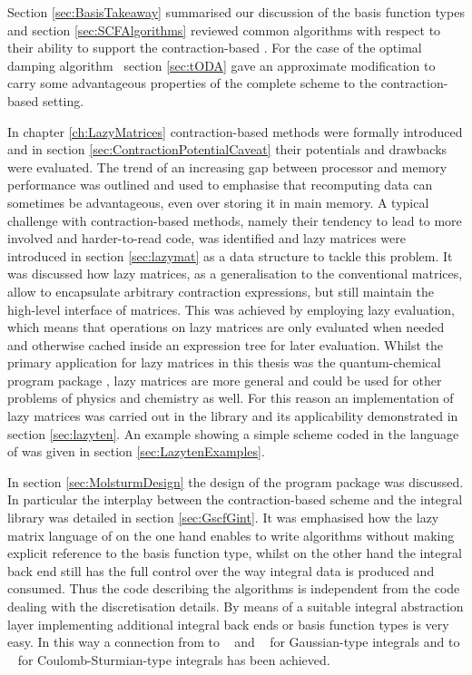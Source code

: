 Section \ref{sec:BasisTakeaway} summarised our discussion of the basis
function types and section \ref{sec:SCFAlgorithms}
reviewed common \SCF algorithms
with respect to their ability to support the contraction-based \SCF.
For the case of the optimal damping algorithm~\cite{Cances2000a}
section \ref{sec:tODA} gave an approximate modification
to carry some advantageous
properties of the complete scheme to the contraction-based setting.


In chapter \ref{ch:LazyMatrices} contraction-based methods
were formally introduced and in section \ref{sec:ContractionPotentialCaveat}
their potentials and drawbacks were evaluated.
The trend of an increasing gap between processor and memory performance
was outlined and used to emphasise that recomputing data
can sometimes be advantageous, even over storing it in main memory.
A typical challenge with contraction-based methods,
namely their tendency to lead to more involved and harder-to-read code,
was identified
and lazy matrices were introduced in section \ref{sec:lazymat}
as a data structure to tackle this problem.
It was discussed how lazy matrices, as a generalisation
to the conventional matrices,
allow to encapsulate arbitrary contraction expressions,
but still maintain the high-level interface of matrices.
This was achieved by employing lazy evaluation,
which means that operations on lazy matrices are only
evaluated when needed
and otherwise cached inside an expression tree for later evaluation.
Whilst the primary application for lazy matrices in this thesis was the quantum-chemical
program package \molsturm,
lazy matrices are more general and could be used for other problems
of physics and chemistry as well.
For this reason an implementation of lazy matrices was carried out
in the \lazyten library
and its applicability demonstrated in section \ref{sec:lazyten}.
An example showing a simple \SCF scheme coded in the language of \lazyten
was given in section \ref{sec:LazytenExamples}.


In section \ref{sec:MolsturmDesign}
the design of the \molsturm program package was discussed.
In particular the interplay between
the contraction-based \SCF scheme and the integral library
was detailed in section \ref{sec:GscfGint}.
It was emphasised how the lazy matrix language of \lazyten
on the one hand
enables to write \SCF algorithms
without making explicit reference to the basis function type,
whilst on the other hand
the integral back end still has the full
control over the way integral data is produced and consumed.
Thus the code describing
the \SCF algorithms is independent from the code
dealing with the discretisation details.
By means of a suitable integral abstraction layer
implementing additional integral back ends or basis function types
is very easy.
In this way a connection from \molsturm
to \libint~\cite{Libint2_231,Libint2} and \libcint~\cite{Sun2015}
for Gaussian-type integrals
and to \sturmint~\cite{sturmintWeb}
for Coulomb-Sturmian-type integrals has been achieved.

